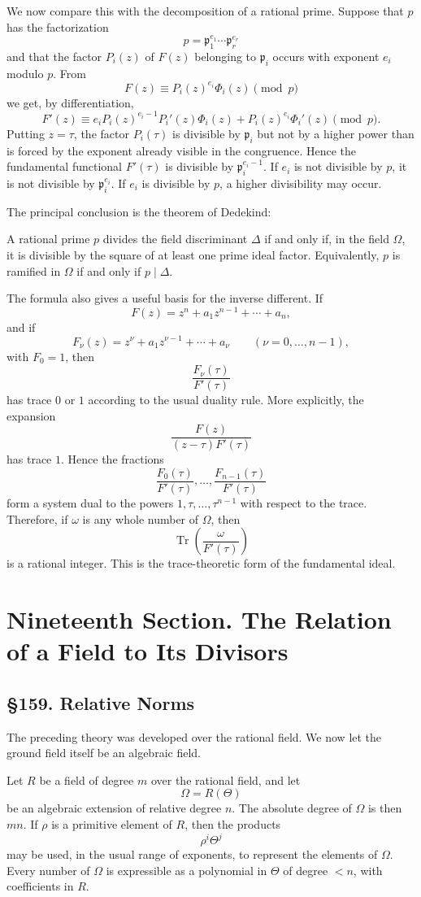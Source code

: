 \documentclass[11pt,a4paper]{book}
\newcommand{\webersection}[2]{\clearpage\section*{\S #1. #2}}
\newcommand{\booktitle}[1]{\clearpage\chapter*{#1}}
\newcommand{\p}{\mathfrak p}
\DeclareMathOperator{\Tr}{Tr}
\begin{document}
We now compare this with the decomposition of a rational prime.  Suppose that \(p\) has the factorization
\[
  p=\p_1^{e_1}\cdots\p_r^{e_r}
\]
and that the factor \(P_i(z)\) of \(F(z)\) belonging to \(\p_i\) occurs with exponent \(e_i\) modulo \(p\).  From
\[
  F(z)\equiv P_i(z)^{e_i}\Phi_i(z)\pmod p
\]
we get, by differentiation,
\[
  F'(z)\equiv e_iP_i(z)^{e_i-1}P_i'(z)\Phi_i(z)
        +P_i(z)^{e_i}\Phi_i'(z)\pmod p.
\]
Putting \(z=\tau\), the factor \(P_i(\tau)\) is divisible by \(\p_i\) but not by a higher power than is forced by the exponent already visible in the congruence.  Hence the fundamental functional \(F'(\tau)\) is divisible by \(\p_i^{e_i-1}\).  If \(e_i\) is not divisible by \(p\), it is not divisible by \(\p_i^{e_i}\).  If \(e_i\) is divisible by \(p\), a higher divisibility may occur.

The principal conclusion is the theorem of Dedekind:

A rational prime \(p\) divides the field discriminant \(\Delta\) if and only if, in the field \(\Omega\), it is divisible by the square of at least one prime ideal factor.  Equivalently, \(p\) is ramified in \(\Omega\) if and only if \(p\mid\Delta\).

The formula also gives a useful basis for the inverse different.  If
\[
  F(z)=z^n+a_1z^{n-1}+\cdots+a_n,
\]
and if
\[
  F_\nu(z)=z^\nu+a_1z^{\nu-1}+\cdots+a_\nu
  \qquad (\nu=0,\ldots,n-1),
\]
with \(F_0=1\), then
\[
  \frac{F_\nu(\tau)}{F'(\tau)}
\]
has trace \(0\) or \(1\) according to the usual duality rule.  More explicitly, the expansion
\[
  \frac{F(z)}{(z-\tau)F'(\tau)}
\]
has trace \(1\).  Hence the fractions
\[
  \frac{F_0(\tau)}{F'(\tau)},\ldots,
  \frac{F_{n-1}(\tau)}{F'(\tau)}
\]
form a system dual to the powers \(1,\tau,\ldots,\tau^{n-1}\) with respect to the trace.  Therefore, if \(\omega\) is any whole number of \(\Omega\), then
\[
  \Tr\!\left(\frac{\omega}{F'(\tau)}\right)
\]
is a rational integer.  This is the trace-theoretic form of the fundamental ideal.

\booktitle{Nineteenth Section. The Relation of a Field to Its Divisors}

\webersection{159}{Relative Norms}

The preceding theory was developed over the rational field.  We now let the ground field itself be an algebraic field.

Let \(R\) be a field of degree \(m\) over the rational field, and let
\[
  \Omega=R(\Theta)
\]
be an algebraic extension of relative degree \(n\).  The absolute degree of \(\Omega\) is then \(mn\).  If \(\rho\) is a primitive element of \(R\), then the products
\[
  \rho^i\Theta^j
\]
may be used, in the usual range of exponents, to represent the elements of \(\Omega\).  Every number of \(\Omega\) is expressible as a polynomial in \(\Theta\) of degree \(<n\), with coefficients in \(R\).
\end{document}
